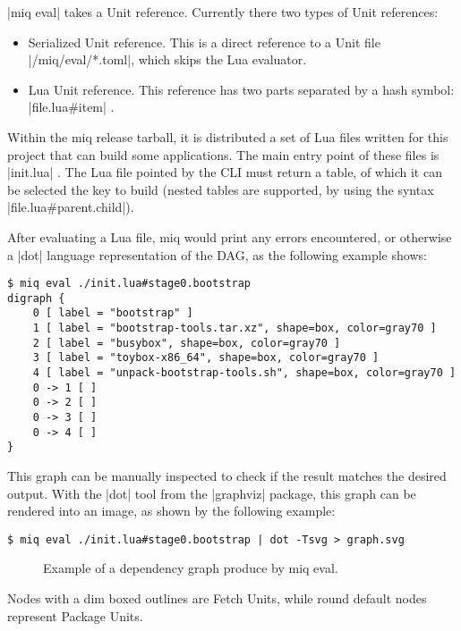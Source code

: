 |miq eval| takes a Unit reference. Currently there two types
of Unit references:

\begin{itemize}
    \item Serialized Unit reference. This is a direct
    reference to a Unit file |/miq/eval/*.toml|, which skips
    the Lua evaluator.
    \item Lua Unit reference. This reference has two parts
    separated by a hash symbol: |file.lua#item| .
\end{itemize}

Within the miq release tarball, it is distributed a set of
Lua files written for this project that can build some
applications. The main entry point of these files is
|init.lua| . The Lua file pointed by the \ac{CLI} must
return a table, of which it can be selected the key to
build (nested tables are supported, by using the syntax
|file.lua#parent.child|).

After evaluating a Lua file, miq would print any errors
encountered, or otherwise a |dot| language representation of
the \ac{DAG}, as the following example shows:

\begin{verbatim}
$ miq eval ./init.lua#stage0.bootstrap
digraph {
    0 [ label = "bootstrap" ]
    1 [ label = "bootstrap-tools.tar.xz", shape=box, color=gray70 ]
    2 [ label = "busybox", shape=box, color=gray70 ]
    3 [ label = "toybox-x86_64", shape=box, color=gray70 ]
    4 [ label = "unpack-bootstrap-tools.sh", shape=box, color=gray70 ]
    0 -> 1 [ ]
    0 -> 2 [ ]
    0 -> 3 [ ]
    0 -> 4 [ ]
}
\end{verbatim}

This graph can be manually inspected to check if the result
matches the desired output. With the |dot| tool from the
|graphviz| package, this graph can be rendered into an
image, as shown by the following example:

\begin{verbatim}
$ miq eval ./init.lua#stage0.bootstrap | dot -Tsvg > graph.svg
\end{verbatim}

\begin{figure}[hbt]
    \centerfloat
    
    \caption{Example of a dependency graph produce by miq eval.}
    \label{fig:miq-eval-graph}
\end{figure}

Nodes with a dim boxed outlines are Fetch Units, while round
default nodes represent Package Units.


